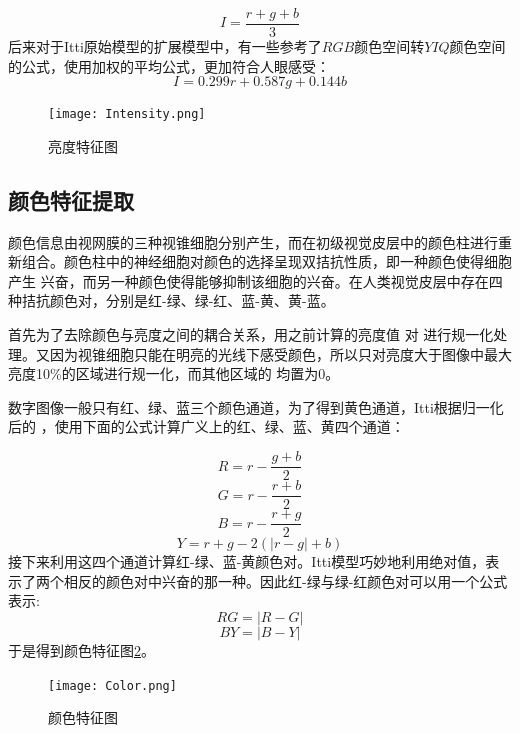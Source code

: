 \documentclass[a4paper,10pt]{article}\large
\begin{document}
\begin{equation}
I=\frac{r+g+b}{3}
\end{equation}
后来对于Itti原始模型的扩展模型中，有一些参考了$RGB$颜色空间转$YIQ$颜色空间的公式，使用加权的平均公式，更加符合人眼感受：
\begin{equation}
I=0.299r+0.587g+0.144b
\end{equation}

\begin{figure}[!htb]
\centering
\texttt{[image: Intensity.png]}
\caption{亮度特征图}\label{fig:2} 
\end{figure}

\subsection{颜色特征提取}

颜色信息由视网膜的三种视锥细胞分别产生，而在初级视觉皮层中的颜色柱进行重新组合。颜色柱中的神经细胞对颜色的选择呈现双拮抗性质，即一种颜色使得细胞产生
兴奋，而另一种颜色使得能够抑制该细胞的兴奋。在人类视觉皮层中存在四种拮抗颜色对，分别是红-绿、绿-红、蓝-黄、黄-蓝。


首先为了去除颜色与亮度之间的耦合关系，用之前计算的亮度值 对 进行规一化处理。又因为视锥细胞只能在明亮的光线下感受颜色，所以只对亮度大于图像中最大亮度10\%的区域进行规一化，而其他区域的 均置为$0$。



数字图像一般只有红、绿、蓝三个颜色通道，为了得到黄色通道，Itti根据归一化后的 ，使用下面的公式计算广义上的红、绿、蓝、黄四个通道：

\begin{equation}
R=r-\frac{g+b}{2}
\end{equation}
\begin{equation}
G=r-\frac{r+b}{2}
\end{equation}
\begin{equation}
B=r-\frac{r+g}{2}
\end{equation}
\begin{equation}
Y=r+g-2(|r-g|+b)
\end{equation}
接下来利用这四个通道计算红-绿、蓝-黄颜色对。Itti模型巧妙地利用绝对值，表示了两个相反的颜色对中兴奋的那一种。因此红-绿与绿-红颜色对可以用一个公式表示:
\begin{equation}
RG=|R-G|
\end{equation}
\begin{equation}
BY=|B-Y|
\end{equation}
于是得到颜色特征图\ref{fig:3}。
\begin{figure}[!htb]
\centering
\texttt{[image: Color.png]}
\caption{颜色特征图}\label{fig:3} 
\end{figure}
\end{document}
